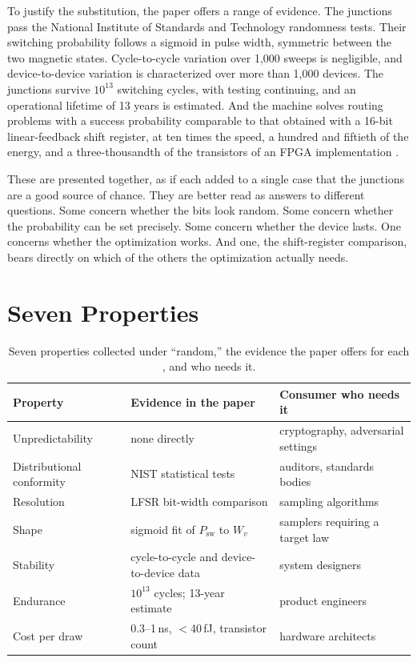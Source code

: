 \documentclass[11pt]{article}
\theoremstyle{definition}
\theoremstyle{remark}
\begin{document}
To justify the substitution, the paper offers a range of evidence. The junctions pass the National Institute of Standards and Technology randomness tests. Their switching probability follows a sigmoid in pulse width, symmetric between the two magnetic states. Cycle-to-cycle variation over 1,000 sweeps is negligible, and device-to-device variation is characterized over more than 1,000 devices. The junctions survive $10^{13}$ switching cycles, with testing continuing, and an operational lifetime of 13 years is estimated. And the machine solves routing problems with a success probability comparable to that obtained with a 16-bit linear-feedback shift register, at ten times the speed, a hundred and fiftieth of the energy, and a three-thousandth of the transistors of an FPGA implementation \cite{li2026}.

These are presented together, as if each added to a single case that the junctions are a good source of chance. They are better read as answers to different questions. Some concern whether the bits look random. Some concern whether the probability can be set precisely. Some concern whether the device lasts. One concerns whether the optimization works. And one, the shift-register comparison, bears directly on which of the others the optimization actually needs.

\section{Seven Properties}

\begin{table}[h]
\centering
\small
\begin{tabular}{p{}p{}p{}}
\toprule
Property & Evidence in the paper & Consumer who needs it \\
\midrule
Unpredictability & none directly & cryptography, adversarial settings \\
Distributional conformity & NIST statistical tests & auditors, standards bodies \\
Resolution & LFSR bit-width comparison & sampling algorithms \\
Shape & sigmoid fit of $P_{\mathrm{sw}}$ to $W_v$ & samplers requiring a target law \\
Stability & cycle-to-cycle and device-to-device data & system designers \\
Endurance & $10^{13}$ cycles; 13-year estimate & product engineers \\
Cost per draw & 0.3--1\,ns, $<$40\,fJ, transistor count & hardware architects \\
\bottomrule
\end{tabular}
\caption{Seven properties collected under ``random,'' the evidence the paper offers for each \cite{li2026}, and who needs it.}
\label{tab:props}
\end{table}
\end{document}
